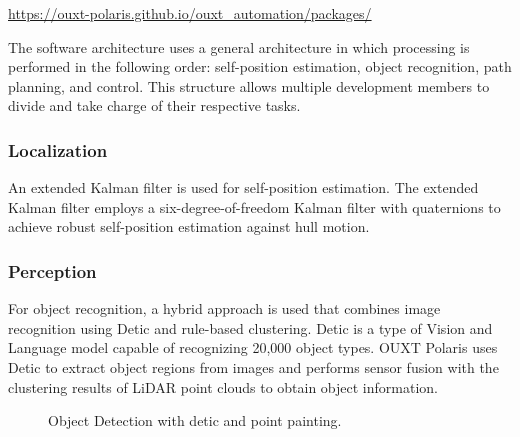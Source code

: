 \documentclass[lettersize,journal]{IEEEtran}
\begin{document}
\url{https://ouxt-polaris.github.io/ouxt_automation/packages/}

The software architecture uses a general architecture in which processing is performed in the following order: self-position estimation, object recognition, path planning, and control.
This structure allows multiple development members to divide and take charge of their respective tasks.

\subsubsection{Localization}

An extended Kalman filter is used for self-position estimation.
The extended Kalman filter employs a six-degree-of-freedom Kalman filter with quaternions to achieve robust self-position estimation against hull motion.

\subsubsection{Perception}

For object recognition, a hybrid approach is used that combines image recognition using Detic and rule-based clustering.
Detic is a type of Vision and Language model capable of recognizing 20,000 object types.
OUXT Polaris uses Detic to extract object regions from images and performs sensor fusion with the clustering results of LiDAR point clouds to obtain object information.

\begin{figure}[H]
  \begin{center}
  \end{center}
  \caption{Object Detection with detic and point painting.}
  \label{fig:arch_nav}
\end{figure}
\end{document}
